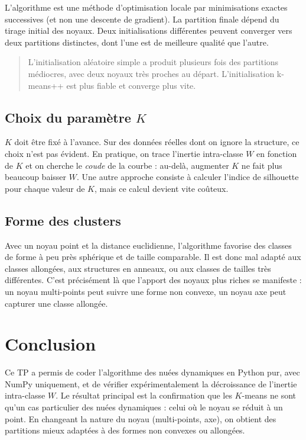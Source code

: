 \documentclass[a4paper, 11pt]{article}
\begin{document}
	
	L'algorithme est une méthode d'optimisation locale par minimisations
	exactes successives (et non une descente de gradient). La partition
	finale dépend du tirage initial des noyaux. Deux initialisations
	différentes peuvent converger vers deux partitions distinctes, dont
	l'une est de meilleure qualité que l'autre.
	
	\begin{quote}
		L'initialisation aléatoire simple a
		produit plusieurs fois des partitions médiocres, avec deux noyaux
		très proches au départ. L'initialisation k-means++ est plus fiable
		et converge plus vite.
	\end{quote}
	
	\subsection{Choix du paramètre \(K\)}
	
	\(K\) doit être fixé à l'avance. Sur des données réelles dont on
	ignore la structure, ce choix n'est pas évident. En pratique, on
	trace l'inertie intra-classe \(W\) en fonction de \(K\) et on
	cherche le \emph{coude} de la courbe : au-delà, augmenter \(K\) ne
	fait plus beaucoup baisser \(W\). Une autre approche consiste à
	calculer l'indice de silhouette pour chaque valeur de \(K\), mais
	ce calcul devient vite coûteux.
	
	\subsection{Forme des clusters}
	
	Avec un noyau point et la distance euclidienne, l'algorithme
	favorise des classes de forme à peu près sphérique et de taille
	comparable. Il est donc mal adapté aux classes allongées, aux
	structures en anneaux, ou aux classes de tailles très différentes.
	C'est précisément là que l'apport des noyaux plus riches se
	manifeste : un noyau multi-points peut suivre une forme non
	convexe, un noyau axe peut capturer une classe allongée.
	
	\newpage
	\section{Conclusion}

	
	Ce TP a permis de coder l'algorithme des nuées dynamiques en Python
	pur, avec NumPy uniquement, et de vérifier expérimentalement la
	décroissance de l'inertie intra-classe \(W\). Le résultat principal
	est la confirmation que les \(K\)-means ne sont qu'un cas particulier
	des nuées dynamiques : celui où le noyau se réduit à un point. En
	changeant la nature du noyau (multi-points, axe), on obtient des
	partitions mieux adaptées à des formes non convexes ou allongées.
	
\end{document}

